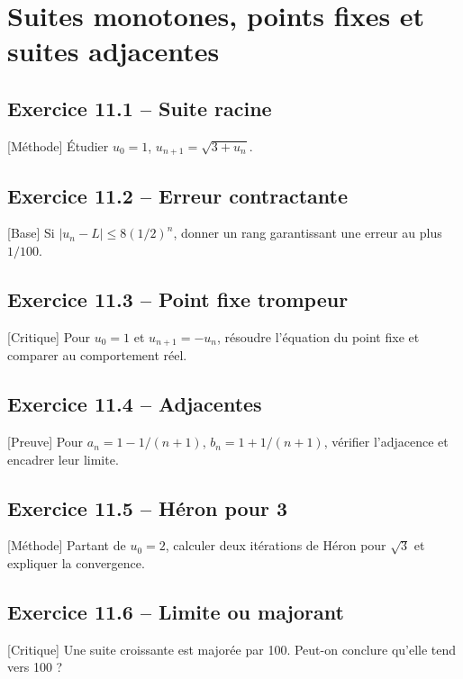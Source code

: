 \chapter{Suites monotones, points fixes et suites adjacentes}
\section*{Exercice 11.1 -- Suite racine}
[Méthode] Étudier $u_0=1$, $u_{n+1}=\sqrt{3+u_n}$.

\section*{Exercice 11.2 -- Erreur contractante}
[Base] Si $|u_n-L|\le8(1/2)^n$, donner un rang garantissant une erreur au plus $1/100$.

\section*{Exercice 11.3 -- Point fixe trompeur}
[Critique] Pour $u_0=1$ et $u_{n+1}=-u_n$, résoudre l'équation du point fixe et comparer au comportement réel.

\section*{Exercice 11.4 -- Adjacentes}
[Preuve] Pour $a_n=1-1/(n+1)$, $b_n=1+1/(n+1)$, vérifier l'adjacence et encadrer leur limite.

\section*{Exercice 11.5 -- Héron pour 3}
[Méthode] Partant de $u_0=2$, calculer deux itérations de Héron pour $\sqrt3$ et expliquer la convergence.

\section*{Exercice 11.6 -- Limite ou majorant}
[Critique] Une suite croissante est majorée par 100. Peut-on conclure qu'elle tend vers 100 ?
